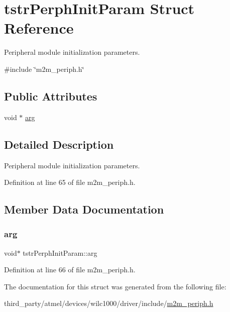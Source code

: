 \hypertarget{structtstrPerphInitParam}{}\section{tstr\+Perph\+Init\+Param Struct Reference}
\label{structtstrPerphInitParam}


Peripheral module initialization parameters.  




{\ttfamily \#include \char`\"{}m2m\+\_\+periph.\+h\char`\"{}}

\subsection*{Public Attributes}
\begin{DoxyCompactItemize}
\item 
void $\ast$ \hyperlink{structtstrPerphInitParam_adfcc64f4648d131d9429120a35fbd201}{arg}
\end{DoxyCompactItemize}


\subsection{Detailed Description}
Peripheral module initialization parameters. 

Definition at line 65 of file m2m\+\_\+periph.\+h.



\subsection{Member Data Documentation}
\mbox{\label{structtstrPerphInitParam_adfcc64f4648d131d9429120a35fbd201}} 
\subsubsection{\texorpdfstring{arg}{arg}}
{\footnotesize\ttfamily void$\ast$ tstr\+Perph\+Init\+Param\+::arg}



Definition at line 66 of file m2m\+\_\+periph.\+h.



The documentation for this struct was generated from the following file\+:\begin{DoxyCompactItemize}
\item 
third\+\_\+party/atmel/devices/wilc1000/driver/include/\hyperlink{m2m__periph_8h}{m2m\+\_\+periph.\+h}\end{DoxyCompactItemize}
